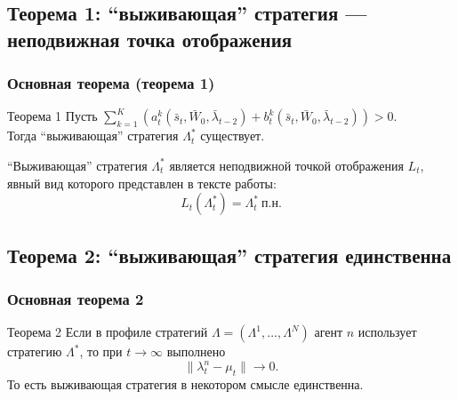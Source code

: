 \documentclass[aspectratio=169]{beamer}
\theoremstyle{definition}
\theoremstyle{remark}
\begin{document}
\subsection{Теорема 1: ``выживающая'' стратегия — неподвижная точка отображения}
    \begin{frame}\frametitle{Основная теорема (теорема 1)}
    \begin{block}{Теорема 1}
    \label{theorem1-main}
    Пусть $\sum_{k=1}^K (a_{t}^k(\bar s_{t}, \bar W_0, \bar\lambda_{t-2}) + b_{t}^k (\bar s_{t}, \bar W_0, \bar\lambda_{t-2})) > 0.$\\
    Тогда ``выживающая'' стратегия $\Lambda_t^*$ существует.
    \end{block}
    
    ``Выживающая'' стратегия $\Lambda_t^*$ является неподвижной точкой отображения $L_t$, явный вид которого представлен в тексте работы:
    \begin{equation}
    \label{3-lambda-star-fixed-point}
    L_{t}(\Lambda_{t}^*) = \Lambda^*_{t}\ \text{п.н.}
    \end{equation}
    
    
    
\end{frame}



\subsection{Теорема 2: ``выживающая'' стратегия единственна}
\begin{frame}\frametitle{Основная теорема 2}
	\begin{block}{Теорема 2}
    \label{theorem2-convergence}
    Если в профиле стратегий $\Lambda=(\Lambda^1,\dots,\Lambda^N)$ агент $n$ использует стратегию $\Lambda^*$, то при $t\to\infty$ выполнено
    \[ 
    \|\lambda_t^n - \mu_t\| \to 0. 
    \]
    То есть выживающая стратегия в некотором смысле единственна.

\end{block}

\end{frame}

\end{document}
